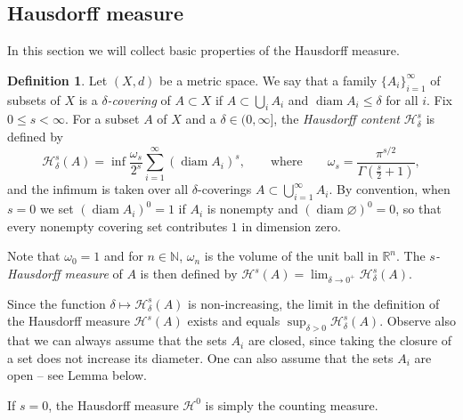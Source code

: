 \documentclass[12pt,leqno]{amsart}
\theoremstyle{definition}
\newtheorem{definition}[theorem]{Definition}
\newcommand{\bbbn}{\mathbb N}
\newcommand{\bbbr}{\mathbb R}
\def\diam{\operatorname{diam}}
\def\H{{\mathcal H}}
\numberwithin{theorem}{section} \numberwithin{equation}{section}
\begin{document}
\subsection{Hausdorff measure}
\label{HAU}
In this section we will collect basic properties of the Hausdorff measure.



\begin{definition}
\label{HMD1}
Let $(X,d)$ be a metric space. We say that a family $\{A_i\}_{i=1}^\infty$ of  subsets of $X$ is a {\em $\delta$-covering} of $A\subset X$ if $A\subset\bigcup_i A_i$ and $\diam A_i\leq \delta$ for all $i$.
Fix $0 \leq s < \infty$. For a subset $A$ of $X$ and a $\delta \in (0,\infty]$, the {\em Hausdorff content} $\H^s_\delta$ is defined by
$$
\H^s_\delta (A)
= \inf \frac{\omega_s}{2^s}\sum_{i=1}^\infty (\diam A_i)^s,
\qquad
\text{where}
\qquad
\omega_s=\frac{\pi^{s/2}}{\Gamma(\tfrac{s}{2}+1)},
$$
and the infimum is taken over all $\delta$-coverings $A\subset\bigcup_{i=1}^\infty A_i$. By convention, when $s=0$ we set $(\diam A_i)^0=1$ if $A_i$ is nonempty and $(\diam \varnothing)^0=0$, so that every nonempty covering set contributes $1$ in dimension zero.

Note that $\omega_0=1$ and for $n\in\bbbn$, $\omega_n$ is the volume of the unit ball in $\bbbr^n$.
The {\em $s$-Hausdorff measure} of $A$ is then defined by
$\H^s(A)=\lim_{\delta\to 0^+} \H^s_\delta(A)$.
\end{definition}

Since the function $\delta\mapsto \H^s_\delta(A)$ is non-increasing, the limit in the definition of the Hausdorff measure $\H^s(A)$ exists and equals $\sup_{\delta>0} \H^s_\delta(A)$. Observe also that we can always assume that the sets $A_i$ are closed, since taking the closure of a set does not increase its diameter. One can also assume that the sets $A_i$ are open -- see Lemma below.

If $s=0$, the Hausdorff measure $\H^0$ is simply the counting measure.
\end{document}
